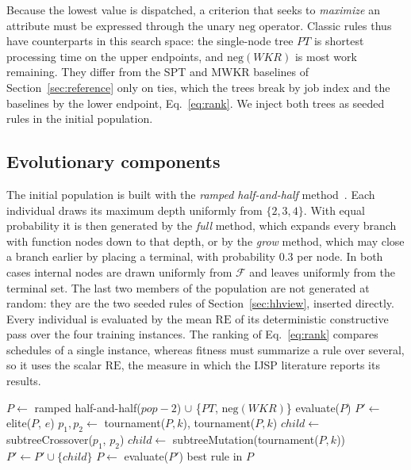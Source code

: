 \documentclass[preprint,number,sort&compress,12pt]{elsarticle}
\newcommand{\RE}{\mathrm{RE}}
\begin{document}
Because the lowest value is dispatched, a criterion that seeks to \emph{maximize}
an attribute must be expressed through the unary $\mathrm{neg}$
operator. Classic rules thus have counterparts in this search space: the
single-node tree $\mathit{PT}$ is shortest processing time on the upper
endpoints, and $\mathrm{neg}(\mathit{WKR})$ is most work remaining. They
differ from the SPT and MWKR baselines of Section~\ref{sec:reference}
only on ties, which the trees break by job index and the baselines by
the lower endpoint, Eq.~\eqref{eq:rank}. We inject both trees as seeded rules in the initial population.




\subsection{Evolutionary components}
\label{sec:evoview}
The initial population is built with the \emph{ramped half-and-half}
method~\citep{Koza1992,Poli2008}. Each individual draws its maximum
depth uniformly from $\{2,3,4\}$. With equal probability it is then
generated by the \emph{full} method, which expands every branch with
function nodes down to that depth, or by the \emph{grow} method, which
may close a branch earlier by placing a terminal, with probability
$0.3$ per node. In both cases internal nodes are drawn uniformly from
$\mathcal{F}$ and leaves uniformly from the terminal set. The last two members of the
population are not generated at random: they are the two seeded rules
of Section~\ref{sec:hhview}, inserted directly.
Every individual is evaluated by the mean $\RE$ of its
deterministic constructive pass over the four training instances.
The ranking of Eq.~\eqref{eq:rank} compares schedules of a single
instance, whereas fitness must summarize a rule over several, so it uses
the scalar $\RE$, the measure in which the IJSP literature reports its
results.

\begin{algorithm}[t]
\caption{GP hyper-heuristic for the IJSP}
\label{alg:gp}
\begin{algorithmic}[1]
\State $P \gets$ ramped half-and-half($\mathit{pop}-2$) $\cup$ \{$\mathit{PT}$, $\mathrm{neg}(\mathit{WKR})$\}
\State evaluate($P$) 
  \State $P' \gets$ elite($P$, $e$) 
      \State $p_1, p_2 \gets$ tournament($P,k$), tournament($P,k$)
      \State $\mathit{child} \gets$ subtreeCrossover($p_1$, $p_2$)
    \Else
      \State $\mathit{child} \gets$ subtreeMutation(tournament($P,k$))
    \EndIf
    \State $P' \gets P' \cup \{\mathit{child}\}$ 
  \EndWhile
  \State $P \gets$ evaluate($P'$)
\EndFor
\State \Return best rule in $P$
\end{algorithmic}
\end{algorithm}
\end{document}

